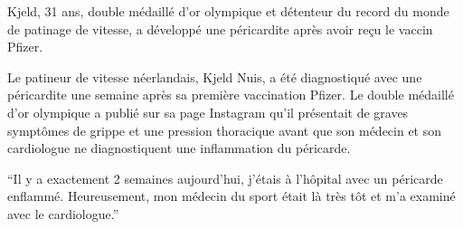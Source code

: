 Kjeld, 31 ans, double médaillé d'or olympique et détenteur du record du monde de
patinage de vitesse, a développé une péricardite après avoir reçu le vaccin
Pfizer.

Le patineur de vitesse néerlandais, Kjeld Nuis, a été diagnostiqué avec une
péricardite une semaine après sa première vaccination Pfizer. Le double médaillé
d'or olympique a publié sur sa page Instagram qu'il présentait de graves
symptômes de grippe et une pression thoracique avant que son médecin et son
cardiologue ne diagnostiquent une inflammation du péricarde.

``Il y a exactement 2 semaines aujourd'hui, j'étais à l'hôpital avec un
péricarde enflammé. Heureusement, mon médecin du sport était là très tôt et m'a
examiné avec le cardiologue.''
